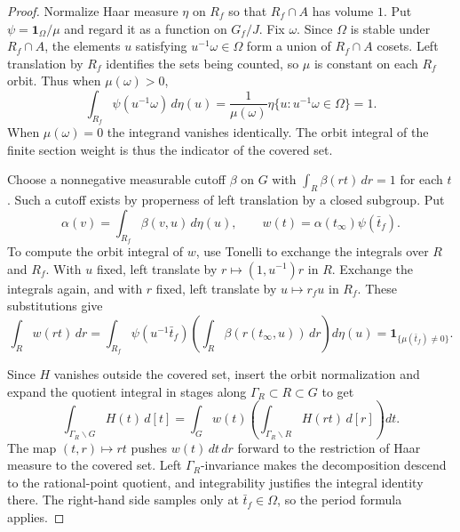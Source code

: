 \begin{proof}
Normalize Haar measure $\eta$ on $R_f$ so that $R_f\cap A$ has volume $1$. Put $\psi=\mathbf 1_\Omega/\mu$ and regard it as a function on $G_f/J$. Fix $\omega$. Since $\Omega$ is stable under $R_f\cap A$, the elements $u$ satisfying $u^{-1}\omega\in\Omega$ form a union of $R_f\cap A$ cosets. Left translation by $R_f$ identifies the sets being counted, so $\mu$ is constant on each $R_f$ orbit. Thus when $\mu(\omega)>0$,
\[
 \int_{R_f}\psi(u^{-1}\omega)\,d\eta(u)
   =\frac{1}{\mu(\omega)}\eta\{u:u^{-1}\omega\in\Omega\}
   =1.
\]
When $\mu(\omega)=0$ the integrand vanishes identically. The orbit integral of the finite section weight is thus the indicator of the covered set.

Choose a nonnegative measurable cutoff $\beta$ on $G$ with $\int_R\beta(rt)\,dr=1$ for each $t$. Such a cutoff exists by properness of left translation by a closed subgroup. Put
\[
 \alpha(v)=\int_{R_f}\beta(v,u)\,d\eta(u),\qquad
 w(t)=\alpha(t_\infty)\psi(\bar t_f).
\]
To compute the orbit integral of $w$, use Tonelli to exchange the integrals over $R$ and $R_f$. With $u$ fixed, left translate by $r\mapsto(1,u^{-1})r$ in $R$. Exchange the integrals again, and with $r$ fixed, left translate by $u\mapsto r_fu$ in $R_f$. These substitutions give
\[
 \int_R w(rt)\,dr
   =\int_{R_f}\psi(u^{-1}\bar t_f)
                 \left(\int_R\beta(r(t_\infty,u))\,dr\right)d\eta(u)
   =\mathbf 1_{\{\mu(\bar t_f)\ne0\}}.
\]

Since $H$ vanishes outside the covered set, insert the orbit normalization and expand the quotient integral in stages along $\Gamma_R\subset R\subset G$ to get
\[
 \int_{\Gamma_R\backslash G}H(t)\,d[t]
   =\int_G w(t)\left(\int_{\Gamma_R\backslash R}H(rt)\,d[r]\right)dt .
\]
The map $(t,r)\mapsto rt$ pushes $w(t)\,dt\,dr$ forward to the restriction of Haar measure to the covered set. Left $\Gamma_R$-invariance makes the decomposition descend to the rational-point quotient, and integrability justifies the integral identity there. The right-hand side samples only at $\bar t_f\in\Omega$, so the period formula applies.


\end{proof}

